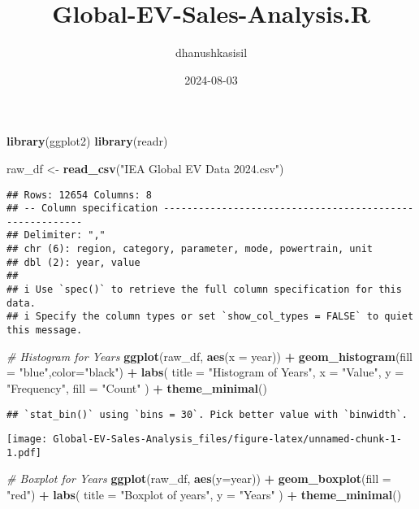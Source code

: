 \documentclass[
]{article}
\title{Global-EV-Sales-Analysis.R}
\author{dhanushkasisil}
\date{2024-08-03}
\newenvironment{Shaded}{\begin{snugshade}}{\end{snugshade}}
\newcommand{\AttributeTok}[1]{\textcolor[rgb]{0.13,0.29,0.53}{#1}}
\newcommand{\CommentTok}[1]{\textcolor[rgb]{0.56,0.35,0.01}{\textit{#1}}}
\newcommand{\FunctionTok}[1]{\textcolor[rgb]{0.13,0.29,0.53}{\textbf{#1}}}
\newcommand{\NormalTok}[1]{#1}
\newcommand{\OtherTok}[1]{\textcolor[rgb]{0.56,0.35,0.01}{#1}}
\newcommand{\SpecialCharTok}[1]{\textcolor[rgb]{0.81,0.36,0.00}{\textbf{#1}}}
\newcommand{\StringTok}[1]{\textcolor[rgb]{0.31,0.60,0.02}{#1}}
\begin{document}
\maketitle

\begin{Shaded}
\begin{Highlighting}[]
\FunctionTok{library}\NormalTok{(ggplot2)}
\FunctionTok{library}\NormalTok{(readr)}

\NormalTok{raw\_df }\OtherTok{\textless{}{-}} \FunctionTok{read\_csv}\NormalTok{(}\StringTok{"IEA Global EV Data 2024.csv"}\NormalTok{)}
\end{Highlighting}
\end{Shaded}

\begin{verbatim}
## Rows: 12654 Columns: 8
## -- Column specification --------------------------------------------------------
## Delimiter: ","
## chr (6): region, category, parameter, mode, powertrain, unit
## dbl (2): year, value
## 
## i Use `spec()` to retrieve the full column specification for this data.
## i Specify the column types or set `show_col_types = FALSE` to quiet this message.
\end{verbatim}

\begin{Shaded}
\begin{Highlighting}[]
\CommentTok{\# Histogram for Years}
\FunctionTok{ggplot}\NormalTok{(raw\_df, }\FunctionTok{aes}\NormalTok{(}\AttributeTok{x =}\NormalTok{ year)) }\SpecialCharTok{+}
  \FunctionTok{geom\_histogram}\NormalTok{(}\AttributeTok{fill =} \StringTok{"blue"}\NormalTok{,}\AttributeTok{color=}\StringTok{"black"}\NormalTok{) }\SpecialCharTok{+}
  \FunctionTok{labs}\NormalTok{(}
    \AttributeTok{title =} \StringTok{"Histogram of Years"}\NormalTok{,}
    \AttributeTok{x =} \StringTok{"Value"}\NormalTok{,}
    \AttributeTok{y =} \StringTok{"Frequency"}\NormalTok{,}
    \AttributeTok{fill =} \StringTok{"Count"}
\NormalTok{  ) }\SpecialCharTok{+}
  \FunctionTok{theme\_minimal}\NormalTok{()}
\end{Highlighting}
\end{Shaded}

\begin{verbatim}
## `stat_bin()` using `bins = 30`. Pick better value with `binwidth`.
\end{verbatim}

\texttt{[image: Global-EV-Sales-Analysis\_files/figure-latex/unnamed-chunk-1-1.pdf]}

\begin{Shaded}
\begin{Highlighting}[]
\CommentTok{\# Boxplot for Years}
\FunctionTok{ggplot}\NormalTok{(raw\_df, }\FunctionTok{aes}\NormalTok{(}\AttributeTok{y=}\NormalTok{year)) }\SpecialCharTok{+} 
  \FunctionTok{geom\_boxplot}\NormalTok{(}\AttributeTok{fill =} \StringTok{"red"}\NormalTok{) }\SpecialCharTok{+} 
  \FunctionTok{labs}\NormalTok{(}
    \AttributeTok{title =} \StringTok{"Boxplot of years"}\NormalTok{,}
    \AttributeTok{y =} \StringTok{"Years"}
\NormalTok{  ) }\SpecialCharTok{+} \FunctionTok{theme\_minimal}\NormalTok{()}
\end{Highlighting}
\end{Shaded}
\end{document}
